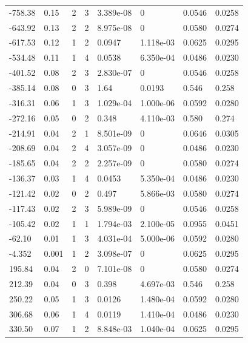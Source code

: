 \documentclass[preview]{standalone}
\begin{document}
{{\begin{tabular}{L{1.2cm}C{1.2cm} C{0.3cm}C{0.5cm} C{1.4cm}C{1.4cm} C{1.4cm}C{1.4cm}}
  -758.38  &  0.15  & 2     &  3 &  3.389e-08  & 0  & 0.0546 &  0.0258   \\ 
  -643.92  &  0.13  & 2     &  2 &  8.975e-08  & 0  & 0.0580 &  0.0274   \\ 
  -617.53  &  0.12  & 1     &  2 &  0.0947  & 1.118e-03  & 0.0625 &  0.0295   \\ 
  -534.48  &  0.11  & 1     &  4 &  0.0538  & 6.350e-04  & 0.0486 &  0.0230   \\ 
  -401.52  &  0.08  & 2     &  3 &  2.830e-07  & 0  & 0.0546 &  0.0258   \\ 
  -385.14  &  0.08  & 0     &  3 &  1.64  & 0.0193  & 0.546 &  0.258   \\ 
  -316.31  &  0.06  & 1     &  3 &  1.029e-04  & 1.000e-06  & 0.0592 &  0.0280   \\ 
  -272.16  &  0.05  & 0     &  2 &  0.348  & 4.110e-03  & 0.580 &  0.274   \\ 
  -214.91  &  0.04  & 2     &  1 &  8.501e-09  & 0  & 0.0646 &  0.0305   \\ 
  -208.69  &  0.04  & 2     &  4 &  3.057e-09  & 0  & 0.0486 &  0.0230   \\ 
  -185.65  &  0.04  & 2     &  2 &  2.257e-09  & 0  & 0.0580 &  0.0274   \\ 
  -136.37  &  0.03  & 1     &  4 &  0.0453  & 5.350e-04  & 0.0486 &  0.0230   \\ 
  -121.42  &  0.02  & 0     &  2 &  0.497  & 5.866e-03  & 0.0580 &  0.0274   \\ 
  -117.43  &  0.02  & 2     &  3 &  5.989e-09  & 0  & 0.0546 &  0.0258   \\ 
  -105.42  &  0.02  & 1     &  1 &  1.794e-03  & 2.100e-05  & 0.0955 &  0.0451   \\ 
  -62.10  &  0.01  & 1     &  3 &  4.031e-04  & 5.000e-06  & 0.0592 &  0.0280   \\ 
  -4.352  &  0.001  & 1     &  2 &  3.098e-07  & 0  & 0.0625 &  0.0295   \\ 
  195.84  &  0.04  & 2     &  0 &  7.101e-08  & 0  & 0.0580 &  0.0274   \\ 
  212.39  &  0.04  & 0     &  3 &  0.398  & 4.697e-03  & 0.546 &  0.258   \\ 
  250.22  &  0.05  & 1     &  3 &  0.0126  & 1.480e-04  & 0.0592 &  0.0280   \\ 
  306.68  &  0.06  & 1     &  4 &  0.0119  & 1.410e-04  & 0.0486 &  0.0230   \\ 
  330.50  &  0.07  & 1     &  2 &  8.848e-03  & 1.040e-04  & 0.0625 &  0.0295   \\ 

\end{tabular}}}
\end{document}
